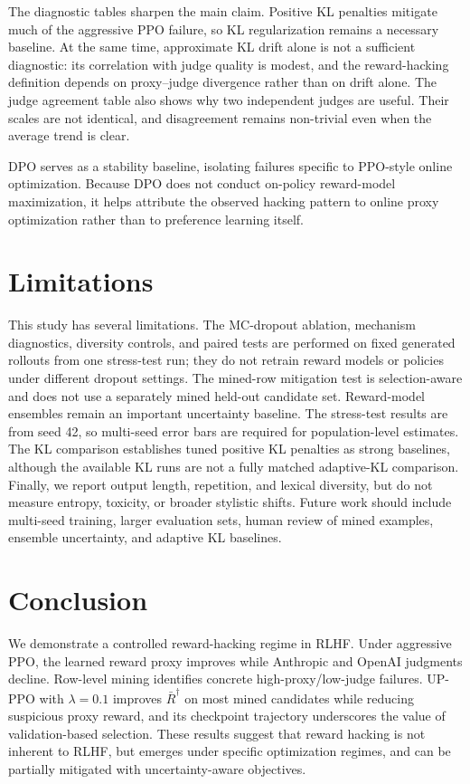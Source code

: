 \documentclass[11pt]{article}
\begin{document}
The diagnostic tables sharpen the main claim. Positive KL penalties mitigate much of the aggressive PPO failure, so KL regularization remains a necessary baseline. At the same time, approximate KL drift alone is not a sufficient diagnostic: its correlation with judge quality is modest, and the reward-hacking definition depends on proxy--judge divergence rather than on drift alone. The judge agreement table also shows why two independent judges are useful. Their scales are not identical, and disagreement remains non-trivial even when the average trend is clear.

DPO serves as a stability baseline, isolating failures specific to PPO-style online optimization. Because DPO does not conduct on-policy reward-model maximization, it helps attribute the observed hacking pattern to online proxy optimization rather than to preference learning itself.



\section{Limitations}
This study has several limitations. The MC-dropout ablation, mechanism diagnostics, diversity controls, and paired tests are performed on fixed generated rollouts from one stress-test run; they do not retrain reward models or policies under different dropout settings. The mined-row mitigation test is selection-aware and does not use a separately mined held-out candidate set. Reward-model ensembles remain an important uncertainty baseline. The stress-test results are from seed 42, so multi-seed error bars are required for population-level estimates. The KL comparison establishes tuned positive KL penalties as strong baselines, although the available KL runs are not a fully matched adaptive-KL comparison. Finally, we report output length, repetition, and lexical diversity, but do not measure entropy, toxicity, or broader stylistic shifts. Future work should include multi-seed training, larger evaluation sets, human review of mined examples, ensemble uncertainty, and adaptive KL baselines.

\section{Conclusion}
We demonstrate a controlled reward-hacking regime in RLHF. Under aggressive PPO, the learned reward proxy improves while Anthropic and OpenAI judgments decline. Row-level mining identifies concrete high-proxy/low-judge failures. UP-PPO with $\lambda=0.1$ improves $\bar R^\dagger$ on most mined candidates while reducing suspicious proxy reward, and its checkpoint trajectory underscores the value of validation-based selection. These results suggest that reward hacking is not inherent to RLHF, but emerges under specific optimization regimes, and can be partially mitigated with uncertainty-aware objectives.
\end{document}
